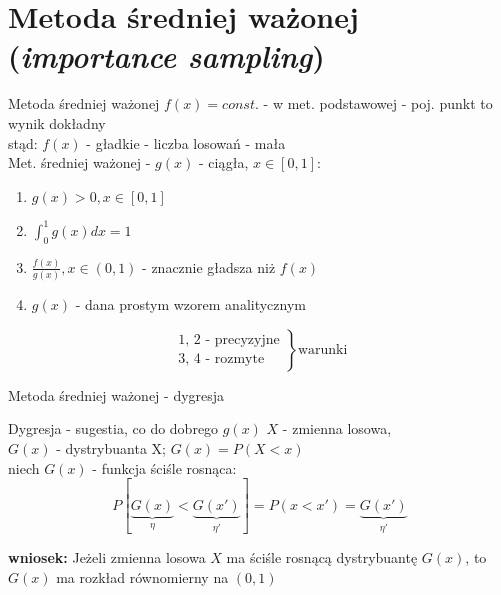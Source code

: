 \section{Metoda średniej ważonej ({\it importance sampling})}
\begin{frame}{Metoda średniej ważonej}
	$f(x) = const.$ - w met. podstawowej - poj. punkt to wynik dokładny \\
    stąd: $f(x)$ - gładkie - liczba losowań - mała
    \\[8pt]
    Met. średniej ważonej - $g(x)$ - ciągła, $x \in [0, 1]$:
    \begin{enumerate}[1)]
    	\item $g(x) > 0, x \in [0, 1]$
        \item $\int_0^1 g(x) dx = 1$
        \item $\frac{f(x)}{g(x)}, x \in (0, 1)$ - znacznie gładsza niż $f(x)$
        \item $g(x)$ - dana prostym wzorem analitycznym
    \end{enumerate}
    
    \[
    	\left.
        	\begin{array}{ll}
        		\text{1, 2 - precyzyjne} \\
        		\text{3, 4 - rozmyte}
        	\end{array}
        \right\} 
        \text{warunki}
    \]
\end{frame}
\begin{frame}{Metoda średniej ważonej - dygresja}
	\begin{block}{Dygresja - sugestia, co do dobrego $g(x)$}
		$X$ - zmienna losowa, \\
        $G(x)$ - dystrybuanta X; $G(x) = P(X < x)$
        \\[8pt]
        niech $G(x)$ - funkcja ściśle rosnąca: \[
        	P[\underbrace{G(x)}_\eta < \underbrace{G(x')}_{\eta'}] = P(x < x') = \underbrace{G(x')}_{\eta'}
        \]
        
        {\bf wniosek:} Jeżeli zmienna losowa $X$ ma ściśle rosnącą dystrybuantę $G(x)$, to $G(x)$ ma rozkład równomierny na $(0, 1)$
	\end{block}
\end{frame}
